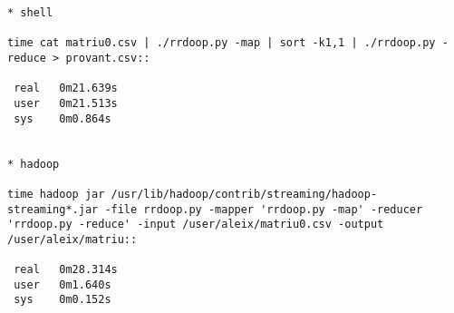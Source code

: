 \begin{verbatim}
* shell

time cat matriu0.csv | ./rrdoop.py -map | sort -k1,1 | ./rrdoop.py -reduce > provant.csv::

 real   0m21.639s
 user   0m21.513s
 sys    0m0.864s


* hadoop

time hadoop jar /usr/lib/hadoop/contrib/streaming/hadoop-streaming*.jar -file rrdoop.py -mapper 'rrdoop.py -map' -reducer 'rrdoop.py -reduce' -input /user/aleix/matriu0.csv -output /user/aleix/matriu::

 real   0m28.314s
 user   0m1.640s
 sys    0m0.152s
\end{verbatim}














